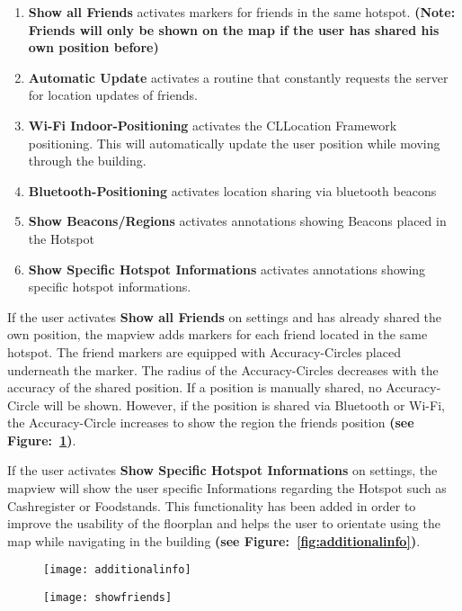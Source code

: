 \begin{enumerate}
\item \textbf{Show all Friends} activates markers for friends in the same hotspot. \textbf{(Note: Friends will only be shown on the map if the user has shared his own position before)}
\item \textbf{Automatic Update} activates a routine that constantly requests the server for location updates of friends. 
\item \textbf{Wi-Fi Indoor-Positioning} activates the CLLocation Framework positioning. This will automatically update the user position while moving through the building.
\item \textbf{Bluetooth-Positioning} activates location sharing via bluetooth beacons
\item \textbf{Show Beacons/Regions} activates annotations showing Beacons placed in the Hotspot
\item \textbf{Show Specific Hotspot Informations} activates annotations showing specific hotspot informations.
\end{enumerate}

If the user activates \textbf{Show all Friends} on settings and has already shared the own position, the mapview adds markers for each friend located in the same hotspot. The friend markers are equipped with Accuracy-Circles placed underneath the marker. The radius of the Accuracy-Circles decreases with the accuracy of the shared position. If a position is manually shared, no Accuracy-Circle will be shown. However, if the position is shared via Bluetooth or Wi-Fi, the Accuracy-Circle increases to show the region the friends position \textbf{(see Figure:~\ref{fig:showfriends})}. 

If the user activates \textbf{Show Specific Hotspot Informations} on settings, the mapview will show the user specific Informations regarding the Hotspot such as Cashregister or Foodstands. This functionality has been added in order to improve the usability of the floorplan and helps the user to orientate using the map while navigating in the building \textbf{(see Figure:~\ref{fig:additionalinfo})}.

\begin{figure}
\centering
\begin{minipage}{.5\textwidth}
  \centering
  \texttt{[image: additionalinfo]}
  \label{fig:additionalinfo}
\end{minipage}%
\begin{minipage}{.5\textwidth}
  \centering
  \texttt{[image: showfriends]}
  \label{fig:showfriends}
\end{minipage}
\end{figure}


